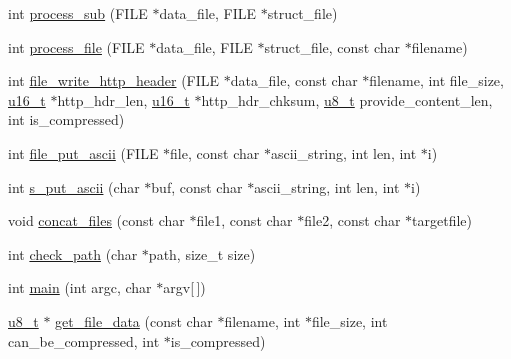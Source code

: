 \begin{DoxyCompactItemize}
\item 
int \hyperlink{openmote-cc2538_2lwip_2src_2apps_2httpd_2makefsdata_2makefsdata_8c_a42e541dd3738ab55217983a6882b4f2d}{process\+\_\+sub} (F\+I\+LE $\ast$data\+\_\+file, F\+I\+LE $\ast$struct\+\_\+file)
\item 
int \hyperlink{openmote-cc2538_2lwip_2src_2apps_2httpd_2makefsdata_2makefsdata_8c_aebd14b6d3b49be243270b9cef5f4040c}{process\+\_\+file} (F\+I\+LE $\ast$data\+\_\+file, F\+I\+LE $\ast$struct\+\_\+file, const char $\ast$filename)
\item 
int \hyperlink{openmote-cc2538_2lwip_2src_2apps_2httpd_2makefsdata_2makefsdata_8c_a7a7e2ed3ae3fb34cf5999ddb1efd55e8}{file\+\_\+write\+\_\+http\+\_\+header} (F\+I\+LE $\ast$data\+\_\+file, const char $\ast$filename, int file\+\_\+size, \hyperlink{group__compiler__abstraction_ga77570ac4fcab86864fa1916e55676da2}{u16\+\_\+t} $\ast$http\+\_\+hdr\+\_\+len, \hyperlink{group__compiler__abstraction_ga77570ac4fcab86864fa1916e55676da2}{u16\+\_\+t} $\ast$http\+\_\+hdr\+\_\+chksum, \hyperlink{group__compiler__abstraction_ga4caecabca98b43919dd11be1c0d4cd8e}{u8\+\_\+t} provide\+\_\+content\+\_\+len, int is\+\_\+compressed)
\item 
int \hyperlink{openmote-cc2538_2lwip_2src_2apps_2httpd_2makefsdata_2makefsdata_8c_ae1515e6c1677553b47e37e4873249a42}{file\+\_\+put\+\_\+ascii} (F\+I\+LE $\ast$file, const char $\ast$ascii\+\_\+string, int len, int $\ast$i)
\item 
int \hyperlink{openmote-cc2538_2lwip_2src_2apps_2httpd_2makefsdata_2makefsdata_8c_a0cfb02efa2b6ced8afac6e73eee1bcf2}{s\+\_\+put\+\_\+ascii} (char $\ast$buf, const char $\ast$ascii\+\_\+string, int len, int $\ast$i)
\item 
void \hyperlink{openmote-cc2538_2lwip_2src_2apps_2httpd_2makefsdata_2makefsdata_8c_a9981150f1a5aa4aba1dea4469748c062}{concat\+\_\+files} (const char $\ast$file1, const char $\ast$file2, const char $\ast$targetfile)
\item 
int \hyperlink{openmote-cc2538_2lwip_2src_2apps_2httpd_2makefsdata_2makefsdata_8c_a35c69278ed3486ac621f1dc4e8d8f83a}{check\+\_\+path} (char $\ast$path, size\+\_\+t size)
\item 
int \hyperlink{openmote-cc2538_2lwip_2src_2apps_2httpd_2makefsdata_2makefsdata_8c_a0ddf1224851353fc92bfbff6f499fa97}{main} (int argc, char $\ast$argv\mbox{[}$\,$\mbox{]})
\item 
\hyperlink{group__compiler__abstraction_ga4caecabca98b43919dd11be1c0d4cd8e}{u8\+\_\+t} $\ast$ \hyperlink{openmote-cc2538_2lwip_2src_2apps_2httpd_2makefsdata_2makefsdata_8c_a3ee04aa3dceb6f930c0d4a5834ef1377}{get\+\_\+file\+\_\+data} (const char $\ast$filename, int $\ast$file\+\_\+size, int can\+\_\+be\+\_\+compressed, int $\ast$is\+\_\+compressed)

\end{DoxyCompactItemize}
